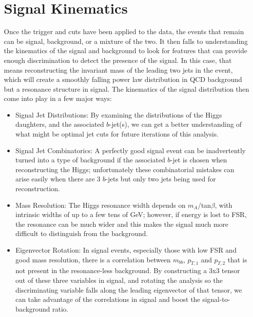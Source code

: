  

\chapter[Signal Kinematics]{Signal Kinematics}

 
Once the trigger and cuts have been applied to the data, the events that remain can be signal, background, or a mixture of the two.  
It then falls to understanding the kinematics of the signal and background to look for features that can
provide enough discrimination to detect the presence of the signal.  In this case, that means reconstructing
the invariant mass of the leading two jets in the event, which will create a smoothly falling power
law distribution in QCD background but a resonance structure in signal.  The kinematics of the signal
distribution then come into play in a few major ways:
\begin{itemize}
    \item Signal Jet \pt Distributions:  By examining the \pt distributions 
    of the Higgs daughters, and the associated $b$-jet(s), 
    we can get a better understanding of what might be optimal jet \pt cuts for future iterations of this analysis. 
    \item Signal Jet Combinatorics: A perfectly good signal event can be inadvertently 
    turned into a type of background if the associated $b$-jet is 
    chosen when reconstructing the Higgs; unfortunately these combinatorial mistakes can arise easily when 
    there are 3 $b$-jets but only two jets being used for reconstruction.
    \item Mass Resolution: The Higgs resonance width depends on $m_A$/tan$\beta$, with intrinsic widths
of up to a few tens of GeV; however, if energy is lost to FSR, the resonance can be much wider and this makes
the signal much more difficult to distinguish from the background.
    \item Eigenvector Rotation: In signal events, especially those with low FSR and good mass resolution,
    there is a correlation between $m_{bb}$, $p_{T,1}$ and $p_{T,2}$ that is not present in the resonance-less
    background.  By constructing a 3x3 tensor out of these three variables in signal, and rotating the analysis so the
    discriminating variable falls along the leading eigenvector of that tensor, we can take advantage of the correlations
    in signal and boost the signal-to-background ratio.
\end{itemize}


